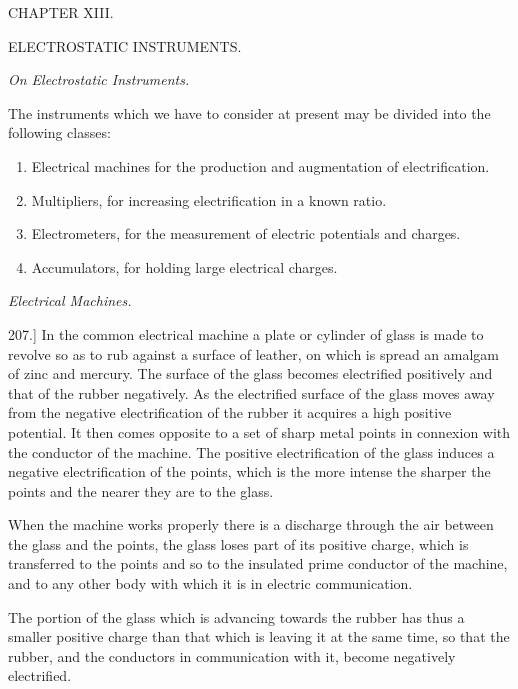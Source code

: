 \documentclass[11pt,a4paper]{article}
\begin{document}
\begin{center}
CHAPTER XIII.

\vspace{0.8em}
ELECTROSTATIC INSTRUMENTS.

\vspace{0.8em}
\textit{On Electrostatic Instruments.}
\end{center}

The instruments which we have to consider at present may be divided into
the following classes:

\begin{enumerate}
\item Electrical machines for the production and augmentation of
electrification.
\item Multipliers, for increasing electrification in a known ratio.
\item Electrometers, for the measurement of electric potentials and
charges.
\item Accumulators, for holding large electrical charges.
\end{enumerate}

\begin{center}
\textit{Electrical Machines.}
\end{center}

207.] In the common electrical machine a plate or cylinder of glass is
made to revolve so as to rub against a surface of leather, on which is
spread an amalgam of zinc and mercury. The surface of the glass becomes
electrified positively and that of the rubber negatively. As the
electrified surface of the glass moves away from the negative
electrification of the rubber it acquires a high positive potential. It
then comes opposite to a set of sharp metal points in connexion with the
conductor of the machine. The positive electrification of the glass
induces a negative electrification of the points, which is the more
intense the sharper the points and the nearer they are to the glass.

When the machine works properly there is a discharge through the air
between the glass and the points, the glass loses part of its positive
charge, which is transferred to the points and so to the insulated prime
conductor of the machine, and to any other body with which it is in
electric communication.

The portion of the glass which is advancing towards the rubber has thus
a smaller positive charge than that which is leaving it at the same time,
so that the rubber, and the conductors in communication with it, become
negatively electrified.
\end{document}
